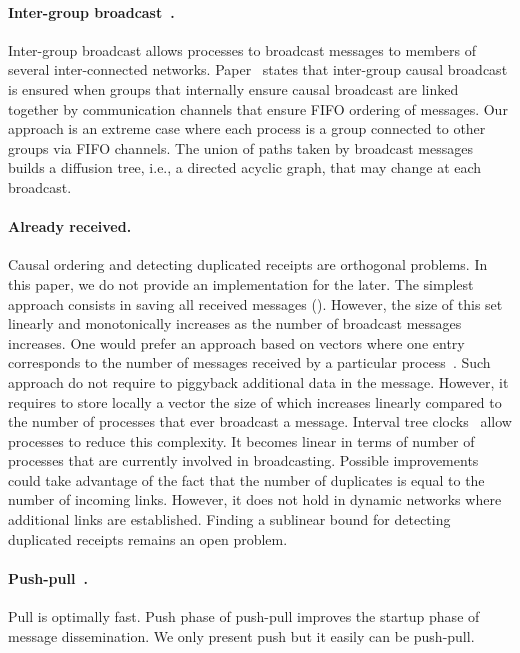 
\paragraph{Inter-group
  broadcast~\cite{johnson1998scalable,johnson1999intergroup}.} Inter-group
broadcast allows processes to broadcast messages to members of several
inter-connected networks. Paper~\cite{johnson1999intergroup} states that
inter-group causal broadcast is ensured when groups that internally ensure
causal broadcast are linked together by communication channels that ensure FIFO
ordering of messages. Our approach is an extreme case where each process is a
group connected to other groups via FIFO channels. The union of paths taken by
broadcast messages builds a diffusion tree, i.e., a directed acyclic graph, that may
change at each broadcast.

\paragraph{Already received.} Causal ordering and detecting duplicated receipts
are orthogonal problems. In this paper, we do not provide an implementation for
the later. The simplest approach consists in saving all received messages
(\REF). However, the size of this set linearly and monotonically increases as
the number of broadcast messages increases. One would prefer an approach based
on vectors where one entry corresponds to the number of messages received by a
particular process~\cite{fidge1988timestamps}. Such approach do not require to
piggyback additional data in the message. However, it requires to store locally
a vector the size of which increases linearly compared to the number of
processes that ever broadcast a message. Interval tree
clocks~\cite{almeida2008interval} allow processes to reduce this complexity. It
becomes linear in terms of number of processes that are currently involved in
broadcasting. Possible improvements could take advantage of the fact that the
number of duplicates is equal to the number of incoming links. However, it does
not hold in dynamic networks where additional links are established. Finding a
sublinear bound for detecting duplicated receipts remains an open problem.

\paragraph{Push-pull~\cite{mercier2017optimal}.} Pull is optimally fast. Push
phase of push-pull improves the startup phase of message dissemination. We only
present push but it easily can be push-pull.


